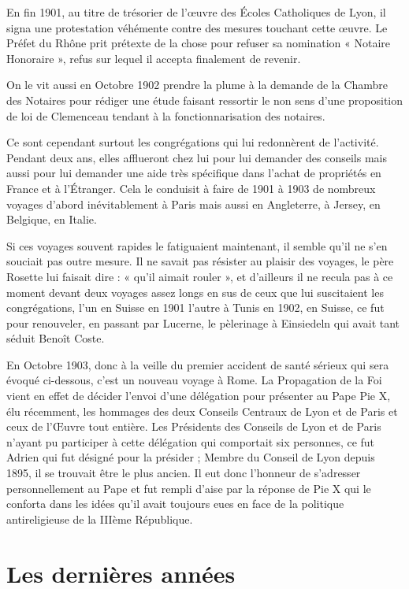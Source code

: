 \documentclass[11pt,a4paper]{report}
\begin{document}
En fin 1901, au titre de trésorier de l'œuvre des Écoles Catholiques de Lyon, il signa une protestation véhémente contre des mesures touchant cette œuvre. Le Préfet du Rhône prit prétexte de la chose pour refuser sa nomination « Notaire Honoraire », refus sur lequel il accepta finalement de revenir.


On le vit aussi en Octobre 1902 prendre la plume à la demande de la Chambre des Notaires pour rédiger une étude faisant ressortir le non sens d'une proposition de loi de Clemenceau tendant à la fonctionnarisation des notaires.

Ce sont cependant surtout les congrégations qui lui redonnèrent de l'activité. Pendant deux ans, elles afflueront chez lui pour lui demander des conseils mais aussi pour lui demander une aide très spécifique dans l'achat de propriétés en France et à l'Étranger. Cela le conduisit à faire de 1901 à 1903 de nombreux voyages d'abord inévitablement à Paris mais aussi en Angleterre, à Jersey, en Belgique, en Italie.

Si ces voyages souvent rapides le fatiguaient maintenant, il semble qu'il ne s'en souciait pas outre mesure. Il ne savait pas résister au plaisir des voyages, le père Rosette lui faisait dire : « qu'il aimait rouler », et d'ailleurs il ne recula pas à ce moment devant deux voyages assez longs en sus de ceux que lui suscitaient les congrégations, l'un en Suisse en 1901 l'autre à Tunis en 1902, en Suisse, ce fut pour renouveler, en passant par Lucerne, le pèlerinage à Einsiedeln qui avait tant séduit Benoît Coste.

En Octobre 1903, donc à la veille du premier accident de santé sérieux qui sera évoqué ci-dessous, c'est un nouveau voyage à Rome. La Propagation de la Foi vient en effet de décider l'envoi d'une délégation pour présenter au Pape Pie X, élu récemment, les hommages des deux Conseils Centraux de Lyon et de Paris et ceux de l'Œuvre tout entière. Les Présidents des Conseils de Lyon et de Paris n'ayant pu participer à cette délégation qui comportait six personnes, ce fut Adrien qui fut désigné pour la présider ; Membre du Conseil de Lyon depuis 1895, il se trouvait être le plus ancien. Il eut donc l'honneur de s'adresser personnellement au Pape et fut rempli d'aise par la réponse de Pie X qui le conforta dans les idées qu'il avait toujours eues en face de la politique antireligieuse de la IIIème République.

\chapter{Les dernières années}\label{les-derniuxe8res-annuxe9es}
\end{document}
